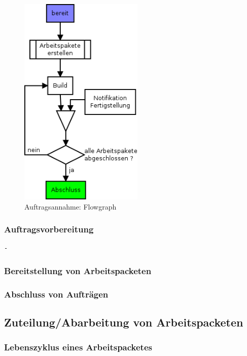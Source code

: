 \begin{figure}[ht] 
  \centering
  \label{fig:lebenszyklus-auftrag-abarbeitung}
  \includegraphics[height=4in]{imageinput/lebenszyklus-auftrag-abarbeitung.png}
  \caption{Auftragsannahme: Flowgraph}
\end{figure}

\subsubsection{Auftragsvorbereitung}

\begin{verbatim}
- 
\end{verbatim}


\subsubsection{Bereitstellung von Arbeitspacketen}
\subsubsection{Abschluss von Auftr\"agen}


\subsection{Zuteilung/Abarbeitung von Arbeitspacketen}


\subsubsection{Lebenszyklus eines Arbeitspacketes}


